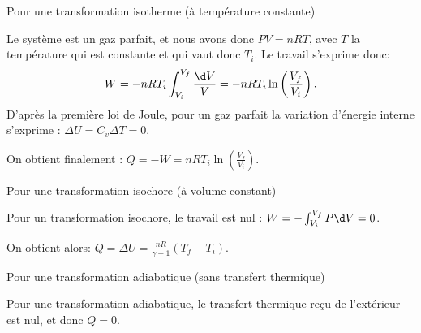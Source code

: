 \begin{enonce}
Pour une transformation isotherme (à température constante)
\end{enonce}


\begin{corrige}
Le système est un gaz parfait, et nous avons donc $PV=nRT$, avec $T$ la température qui est constante et qui vaut donc $T_i$.
Le travail s'exprime donc:
\[
W= -nRT_i \int_{V_i}^{V_f} \frac{\d V}{V} =-nRT_i \ln\left( \frac{V_f}{V_i} \right).
\]
D'après la première loi de Joule, pour un gaz parfait la variation d'énergie interne s'exprime : $\Delta U = C_v \Delta T = 0$.

On obtient finalement : $Q= -W= nRT_i \ln \left(\frac{V_f}{V_i}\right)$.
\end{corrige}





\begin{enonce}
Pour une transformation isochore (à volume constant)
\end{enonce}


\begin{corrige}
Pour un transformation isochore, le travail est nul : $W= -\int_{V_i}^{V_f} P\d V = 0$.

On obtient alors: $Q= \Delta U = \frac{nR}{\gamma-1} (T_f - T_i)$.
\end{corrige}




\begin{enonce}
Pour une transformation adiabatique (sans transfert thermique)
\end{enonce}


\begin{corrige}
Pour une transformation adiabatique, le transfert thermique reçu de l'extérieur est nul, et donc $Q=0$.
\end{corrige}


